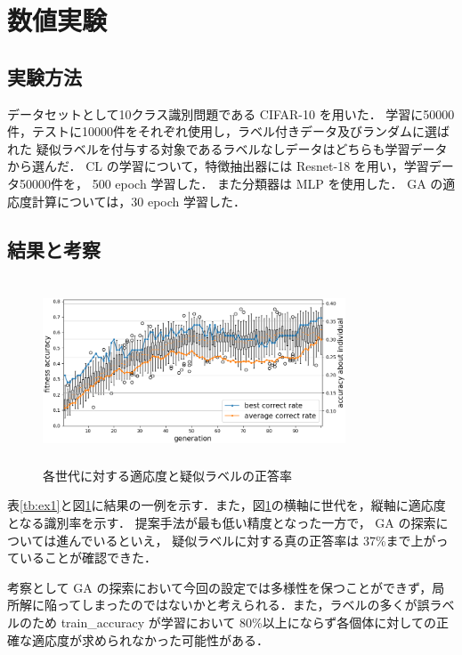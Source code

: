 \documentclass[a4paper,twoside,twocolumn,10pt]{jarticle}     %
\begin{document}
\section{数値実験}
\subsection{実験方法}
データセットとして10クラス識別問題である CIFAR-10 を用いた．
学習に50000件，テストに10000件をそれぞれ使用し，ラベル付きデータ及びランダムに選ばれた
疑似ラベルを付与する対象であるラベルなしデータはどちらも学習データから選んだ．
CL の学習について，特徴抽出器には Resnet-18 を用い，学習データ50000件を， 500 epoch 学習した．
また分類器は MLP を使用した．
GA の適応度計算については，30 epoch 学習した．
\subsection{結果と考察}
\begin{figure}[t]
	\begin{center}
		\includegraphics[height=55mm,width=90mm]{graph.png}
		\caption{各世代に対する適応度と疑似ラベルの正答率\label{fig:ex1}}
	\end{center}
\end{figure}
表\ref{tb:ex1}と図\ref{fig:ex1}に結果の一例を示す．また，図\ref{fig:ex1}の横軸に世代を，縦軸に適応度となる識別率を示す． 提案手法が最も低い精度となった一方で， GA の探索については進んでいるといえ，
疑似ラベルに対する真の正答率は 37\%まで上がっていることが確認できた．

考察として GA の探索において今回の設定では多様性を保つことができず，局所解に陥ってしまったのではないかと考えられる．また，ラベルの多くが誤ラベルのため train\_accuracy が学習において 80\%以上にならず各個体に対しての正確な適応度が求められなかった可能性がある．
\
\begin{table}[h]
	\centering
	\caption{テスト識別率結果\label{tb:ex1}}
\end{table}
\end{document}

